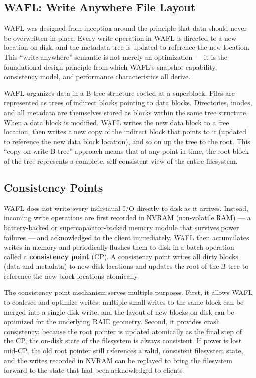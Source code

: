 \subsection{WAFL: Write Anywhere File Layout}

WAFL was designed from inception around the principle that data should never be overwritten in place. Every write operation in WAFL is directed to a new location on disk, and the metadata tree is updated to reference the new location. This ``write-anywhere'' semantic is not merely an optimization --- it is the foundational design principle from which WAFL's snapshot capability, consistency model, and performance characteristics all derive.

WAFL organizes data in a B-tree structure rooted at a superblock. Files are represented as trees of indirect blocks pointing to data blocks. Directories, inodes, and all metadata are themselves stored as blocks within the same tree structure. When a data block is modified, WAFL writes the new data block to a free location, then writes a new copy of the indirect block that points to it (updated to reference the new data block location), and so on up the tree to the root. This ``copy-on-write B-tree'' approach means that at any point in time, the root block of the tree represents a complete, self-consistent view of the entire filesystem.

\subsection{Consistency Points}

WAFL does not write every individual I/O directly to disk as it arrives. Instead, incoming write operations are first recorded in NVRAM (non-volatile RAM) --- a battery-backed or supercapacitor-backed memory module that survives power failures --- and acknowledged to the client immediately. WAFL then accumulates writes in memory and periodically flushes them to disk in a batch operation called a \textbf{consistency point} (CP). A consistency point writes all dirty blocks (data and metadata) to new disk locations and updates the root of the B-tree to reference the new block locations atomically.

The consistency point mechanism serves multiple purposes. First, it allows WAFL to coalesce and optimize writes: multiple small writes to the same block can be merged into a single disk write, and the layout of new blocks on disk can be optimized for the underlying RAID geometry. Second, it provides crash consistency: because the root pointer is updated atomically as the final step of the CP, the on-disk state of the filesystem is always consistent. If power is lost mid-CP, the old root pointer still references a valid, consistent filesystem state, and the writes recorded in NVRAM can be replayed to bring the filesystem forward to the state that had been acknowledged to clients.

